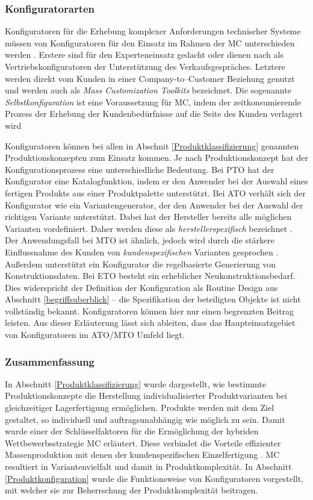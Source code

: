 \documentclass[11pt, a4paper, titlepage, listof=totoc, bibliography=totoc, index=totoc, twoside, openright, headings=normal]{scrreprt}
\begin{document}
\subsubsection*{Konfiguratorarten}
Konfiguratoren für die Erhebung komplexer Anforderungen technischer Systeme  müssen von Konfiguratoren für den Einsatz im Rahmen der \ac{MC} unterschieden werden \citep{felferning14}. Erstere sind für den Experteneinsatz gedacht oder dienen nach \citet{piller06} als Vertriebskonfiguratoren der Unterstützung des Verkaufsgespräches. Letztere werden direkt vom Kunden in einer Company-to–Customer Beziehung genutzt und werden auch als \emph{Mass Customization Toolkits} bezeichnet. Die sogenannte \emph{Selbstkonfiguration} ist eine Voraussetzung für \ac{MC}, indem der zeitkonsumierende Prozess der Erhebung der Kundenbedürfnisse auf die Seite des Kunden verlagert wird \citep{piller06}

Konfiguratoren können bei allen in Abschnit \ref{Produktklassifizierung} genannten Produktionskonzepten zum Einsatz kommen. Je nach Produktionskonzept hat der Konfigurationsprozess eine unterschiedliche Bedeutung. Bei \ac{PTO} hat der Konfigurator eine Katalogfunktion, indem er den Anwender bei der Auswahl eines fertigen Produkts aus einer Produktpalette unterstützt. Bei \ac{ATO} verhält sich der Konfigurator wie ein Variantengenerator, der den Anwender bei der Auswahl der richtigen Variante unterstützt. Dabei hat der Hersteller bereits alle möglichen Varianten vordefiniert. Daher werden diese als \emph{herstellerspezifisch} bezeichnet \citep{schomburg80}. Der Anwendungsfall bei \ac{MTO} ist ähnlich, jedoch wird durch die stärkere Einflussnahme des Kunden von \emph{kundenspezifischen} Varianten gesprochen \citep{schomburg80}. Außerdem unterstützt ein Konfigurator die regelbasierte Generierung von Konstruktionsdaten. Bei \ac{ETO} besteht ein erheblicher Neukonstruktionsbedarf. Dies widerspricht der Definition der Konfiguration als Routine Design aus Abschnitt \ref{begriffsuberblick} -- die Spezifikation der beteiligten Objekte ist nicht vollständig bekannt. Konfiguratoren können hier nur einen begrenzten Beitrag leisten. Aus dieser Erläuterung lässt sich ableiten, dass das Haupteinsatzgebiet von Konfiguratoren im \ac{ATO}/\ac{MTO} Umfeld liegt.

\subsubsection*{Zusammenfassung}
In Abschnitt \ref{Produktklassifizierung} wurde dargestellt, wie bestimmte Produktionskonzepte die Herstellung individualisierter Produktvarianten bei gleichzeitiger Lagerfertigung ermöglichen. Produkte werden mit dem Ziel gestaltet, so individuell und auftragsunabhängig wie möglich zu sein. Damit wurde einer der Schlüsselfaktoren für die Ermöglichung der hybriden Wettbewerbsstrategie \ac{MC} erläutert. Diese verbindet die Vorteile effizienter Massenproduktion mit denen
der kundenspezifischen Einzelfertigung \citep{piller98}. \ac{MC} resultiert in Variantenvielfalt und damit in Produktkomplexität. In Abschnitt \ref{Produktkonfiguration} wurde die Funktionsweise von Konfiguratoren vorgestellt, mit welcher sie zur Beherrschung der Produktkomplexität beitragen.
\end{document}
